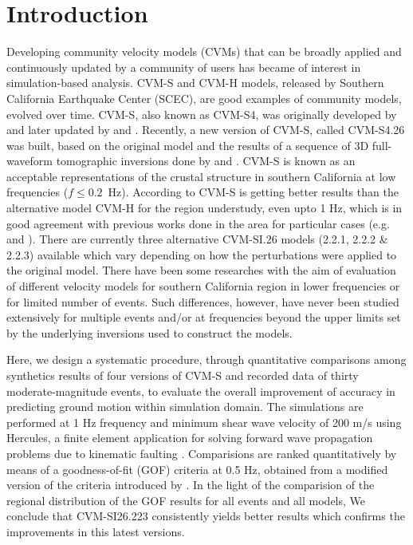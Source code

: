 \section{Introduction}

Developing community velocity models (CVMs) that can be broadly applied and continuously updated by a community of users has became of interest in simulation-based analysis. CVM-S and CVM-H models, released by Southern California Earthquake Center (SCEC), are good examples of community models, evolved over time. CVM-S, also known as CVM-S4, was originally developed by \citet{Magistrale_1996_BSSA} and later updated by \citet{Magistrale_2000_BSSA} and \citet{Kohler_2003_BSSA}. Recently, a new version of CVM-S, called CVM-S4.26 was built, based on the original model and the results of a sequence of 3D full-waveform tomographic inversions done by \citet{Chen_2007_BSSA} and \citet{Lee_2014_JGR}. CVM-S is known as an acceptable representations of the crustal structure in southern California at low frequencies ($f \leq 0.2$~Hz). According to \citet{Taborda_2016} CVM-S is getting better results than the alternative model CVM-H for the region understudy, even upto 1 Hz, which is in good agreement with previous works done in the area for particular cases (e.g. \citet{Taborda_2014_BSSA} and \citet{Lee_2014_SRL}). There are currently three alternative CVM-SI.26 models (2.2.1, 2.2.2 \& 2.2.3) available which vary depending on how the perturbations were applied to the original model. There have been some researches with the aim of evaluation of different velocity models for southern California region in lower frequencies or for limited number of events. Such differences, however, have never been studied extensively for multiple events and/or at frequencies beyond the upper limits set by the underlying inversions used to construct the models.\par
Here, we design a systematic procedure, through quantitative comparisons among synthetics results of four versions of CVM-S and recorded data of thirty moderate-magnitude events, to evaluate the overall improvement of accuracy in predicting ground motion within simulation domain. The simulations are performed at 1 Hz frequency and minimum shear wave velocity of 200 m/s using Hercules, a finite element application for solving forward wave propagation problems due to kinematic faulting \citep{Tu_2006_Proc, Taborda_2010_Tech}. Comparisions are ranked quantitatively by means of a goodness-of-fit (GOF) criteria at 0.5 Hz, obtained from a modified version of the criteria introduced by \citet{Anderson_2004_Proc}. In the light of the comparision of the regional distribution of the GOF results for all events and all models, We conclude that CVM-SI26.223 consistently yields better results which confirms the improvements in this latest versions.
